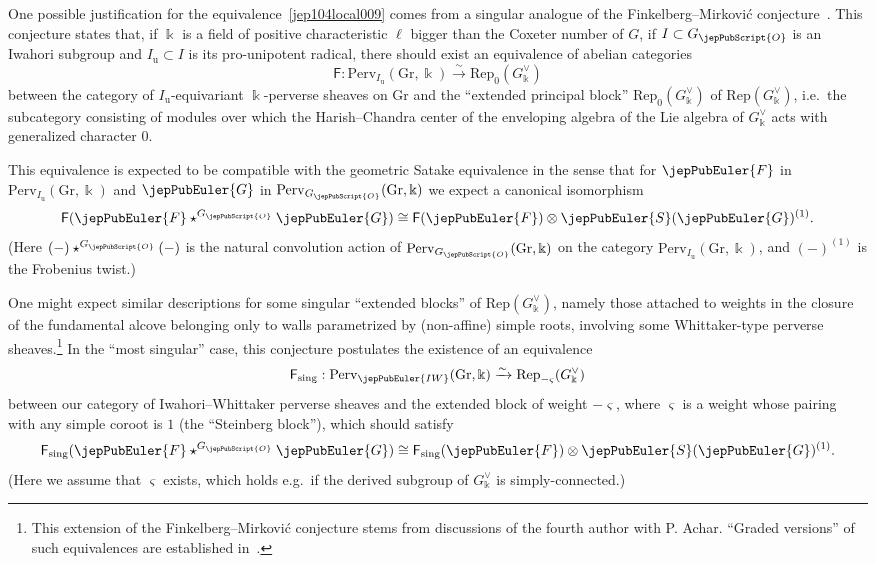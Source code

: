 One possible justification for the equivalence~\eqref{jep104local009} comes from a singular analogue of the Finkelberg--Mirkovi\'c conjecture~\cite{jep104ref22}. This conjecture states that, if $\Bbbk$ is a field of positive characteristic $\ell$ bigger than the Coxeter number of $G$, if $I \subset G_{\jepPubScript{O}}$ is an Iwahori subgroup and $I_\mathrm{u} \subset I$ is its pro-unipotent radical, there should exist an equivalence of abelian categories
\[
 \mathsf{F}: \mathrm{Perv}_{I_\mathrm{u}}(\mathrm{Gr},\Bbbk) \xrightarrow{\sim} \mathrm{Rep}_0(G^\vee_\Bbbk)
\]
between the category of $I_\mathrm{u}$-equivariant $\Bbbk$-perverse sheaves on $\mathrm{Gr}$ and the ``extended principal block'' $\mathrm{Rep}_0(G^\vee_\Bbbk)$ of $\mathrm{Rep}(G^\vee_\Bbbk)$, i.e.~the subcategory consisting of modules over which the Harish--Chandra center of the enveloping algebra of the Lie algebra of $G^\vee_\Bbbk$ acts with generalized character $0$.

This equivalence is expected to be compatible with the geometric Satake equivalence in the sense that for $\jepPubEuler{F}$ in $\mathrm{Perv}_{I_\mathrm{u}}(\mathrm{Gr},\Bbbk)$ and $\jepPubEuler{G}$ in $\mathrm{Perv}_{G_{\jepPubScript{O}}}(\mathrm{Gr},\Bbbk)$ we expect a canonical isomorphism
\[
 \mathsf{F}(\jepPubEuler{F} \star^{G_{\jepPubScript{O}}} \jepPubEuler{G}) \cong \mathsf{F}(\jepPubEuler{F}) \otimes \jepPubEuler{S}(\jepPubEuler{G})^{(1)}.
\]
(Here $(-) \star^{G_{\jepPubScript{O}}} (-)$ is the natural convolution action of $\mathrm{Perv}_{G_{\jepPubScript{O}}}(\mathrm{Gr},\Bbbk)$ on the category $\mathrm{Perv}_{I_\mathrm{u}}(\mathrm{Gr},\Bbbk)$, and $(-)^{(1)}$ is the Frobenius twist.)

One might expect similar descriptions for some singular ``extended blocks'' of $\mathrm{Rep}(G^\vee_\Bbbk)$, namely those attached to weights in the closure of the fundamental alcove belonging only to walls parametrized by (non-affine) simple roots, involving some Whittaker-type perverse sheaves.\footnote{This extension of the Finkelberg--Mirkovi\'c conjecture stems from discussions of the fourth author with P. Achar. ``Graded versions'' of such equivalences are established in~\cite{jep104ref01}.} In the ``most singular'' case, this conjecture postulates the existence of an equivalence
\[
 \mathsf{F}_{\mathrm{sing}} : \mathrm{Perv}_{\jepPubEuler{IW}}(\mathrm{Gr},\Bbbk) \xrightarrow{\sim} \mathrm{Rep}_{-\varsigma}(G^\vee_\Bbbk)
\]
between our category of Iwahori--Whittaker perverse sheaves and the extended block of weight $-\varsigma$, where $\varsigma$ is a weight whose pairing with any simple coroot is $1$ (the ``Steinberg block''), which should satisfy
\[
 \mathsf{F}_{\mathrm{sing}}(\jepPubEuler{F} \star^{G_{\jepPubScript{O}}} \jepPubEuler{G}) \cong \mathsf{F}_{\mathrm{sing}}(\jepPubEuler{F}) \otimes \jepPubEuler{S}(\jepPubEuler{G})^{(1)}.
\]
(Here we assume that $\varsigma$ exists, which holds e.g.~if the derived subgroup of $G^{\vee}_\Bbbk$ is simply-connected.)

